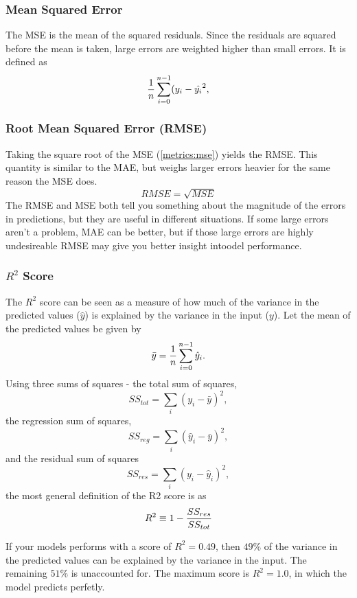 \subsubsection{Mean Squared Error}
The MSE is the mean of the squared residuals. Since the residuals are squared
before the mean is taken, large errors are weighted higher than small errors.
It is defined as
\begin{equation}\label{metrics:mse}
    \frac{1}{n}\sum_{i=0}^{n-1}(y_i - \hat{y_i}^{2},
\end{equation}

\subsubsection{Root Mean Squared Error (RMSE)}
Taking the square root of the MSE (\ref{metrics:mse}) yields the RMSE.
This quantity is similar to the MAE, but weighs larger errors heavier
for the same reason the MSE does.
\begin{equation}
    RMSE = \sqrt{MSE}
\end{equation}
The RMSE and MSE both tell you something about the magnitude of the errors
in predictions, but they are useful in different situations. If some large
errors aren't a problem, MAE can be better, but if those large errors are
highly undesireable RMSE may give you better insight intoodel performance.

\subsubsection{$R^2$ Score}
The $R^2$ score can be seen as a measure of how much of the variance in the
predicted values ($\hat{y}$) is explained by the variance in the input ($y$).
Let the mean of the predicted values be given by
\begin{equation}\label{metrics:mean}
    \bar{y} =\frac{1}{n}\sum_{i=0}^{n-1}\hat{y}_{i}.
\end{equation}
Using three sums of squares - the total sum of squares,
\begin{equation}
    SS_{tot} = \sum_{i}(y_i - \bar{y})^{2},
\end{equation}
the regression sum of squares,
\begin{equation}
    SS_{reg} = \sum_{i}(\hat{y}_i - \bar{y})^{2},
\end{equation}
and the residual sum of squares
\begin{equation}
    SS_{res} = \sum_{i}(y_i - \hat{y}_i)^{2},
\end{equation}
the most general definition of the R2 score is as
\begin{equation}
    R^2 \equiv 1 - \frac{SS_{res}}{SS_{tot}}
\end{equation}

If your models performs with a score of $R^2 = 0.49$, then $49\%$ of the
variance in the predicted values can be explained by the variance in the input.
The remaining $51\%$ is unaccounted for. The maximum score is $R^2 = 1.0$,
in which the model predicts perfetly.


